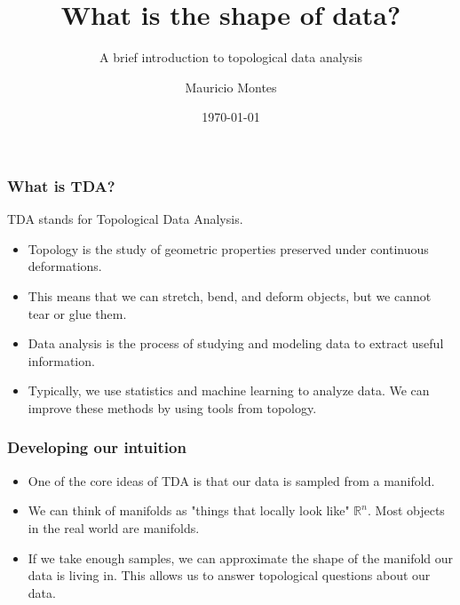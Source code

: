 \documentclass{beamer}
\title{What is the shape of data?}
\subtitle{A brief introduction to topological data analysis}
\author{Mauricio Montes}
\institute{Auburn University}
\date{\today}
\begin{document}
\frame{\titlepage}

\begin{frame}%

\frametitle{What is TDA?}

TDA stands for Topological Data Analysis.

\pause

\begin{itemize}

\item Topology is the study of geometric properties preserved under continuous deformations.

\pause

\item This means that we can stretch, bend, and deform objects, but we cannot tear or glue them.

\pause

\item Data analysis is the process of studying and modeling data to extract useful information.

\pause

\item Typically, we use statistics and machine learning to analyze data. We can
improve these methods by using tools from topology. 

\end{itemize}



\end{frame}

\begin{frame}%

\frametitle{Developing our intuition}

\pause


\begin{itemize}

\item One of the core ideas of TDA is that our data is sampled from a manifold.

\pause

\item We can think of manifolds as "things that locally look like"
$\mathbb{R}^n$. Most objects in the real world are manifolds. 

\pause

\item If we take enough samples, we can approximate the shape of the manifold our data is living in.
  This allows us to answer topological questions about our data. 

\end{itemize}

\end{frame}
\end{document}

